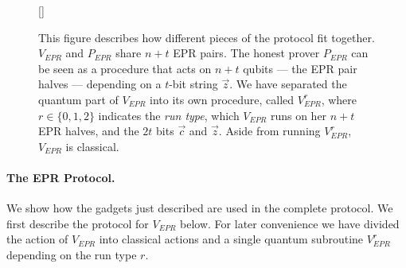 \documentclass{toc}
\begin{document}
\begin{figure}[t]
[\FBwidth]
{
  
}
{\caption{This figure describes how different pieces of the protocol fit together. $V_{EPR}$ and $P_{EPR}$ share $n+t$ EPR pairs. The honest prover $P_{EPR}$ can be seen as a procedure that acts on $n+t$ qubits --- the EPR pair halves --- depending on a $t$-bit string $\vec{z}$.  We have separated the quantum part of $V_{EPR}$ into its own procedure, called $V_{EPR}^{r}$, where $r\in\{0,1,2\}$ indicates the \emph{run type}, which $V_{EPR}$ runs on her $n+t$ EPR halves, and the $2t$ bits $\vec{c}$ and $\vec{z}$. Aside from running $V_{EPR}^r$, $V_{EPR}$ is classical. }\label{fig:EPR-high-level}}
\end{figure}




\paragraph{The EPR Protocol.} We show how the gadgets just described are used in the complete protocol. We first describe the protocol for $V_{EPR}$ below.  For later convenience we have divided the action of $V_{EPR}$ into classical actions and a single quantum subroutine $V_{EPR}^r$ depending on the run type $r$. 
\end{document}
